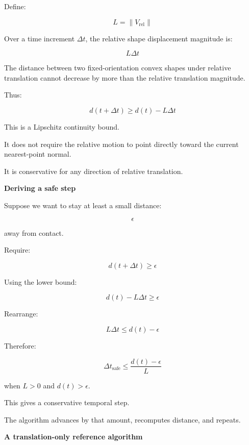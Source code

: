 Define:

\[
\boxed{ L=\|V_{\mathrm{rel}}\| }
\]

Over a time increment \(\Delta t\), the relative shape displacement magnitude is:

\[
L\Delta t
\]

The distance between two fixed-orientation convex shapes under relative translation cannot decrease by more than the relative translation magnitude.

Thus:

\[
\boxed{ d(t+\Delta t)\ge d(t)-L\Delta t }
\]

This is a Lipschitz continuity bound.

It does not require the relative motion to point directly toward the current nearest-point normal.

It is conservative for any direction of relative translation.

\textbf{Deriving a safe step}

Suppose we want to stay at least a small distance:

\[
\epsilon
\]

away from contact.

Require:

\[
d(t+\Delta t)\ge\epsilon
\]

Using the lower bound:

\[
d(t)-L\Delta t\ge\epsilon
\]

Rearrange:

\[
L\Delta t\le d(t)-\epsilon
\]

Therefore:

\[
\boxed{ \Delta t_{\mathrm{safe}} \le \frac{d(t)-\epsilon}{L} }
\]

when \(L>0\) and \(d(t)>\epsilon\).

This gives a conservative temporal step.

The algorithm advances by that amount, recomputes distance, and repeats.

\textbf{A translation-only reference algorithm}

